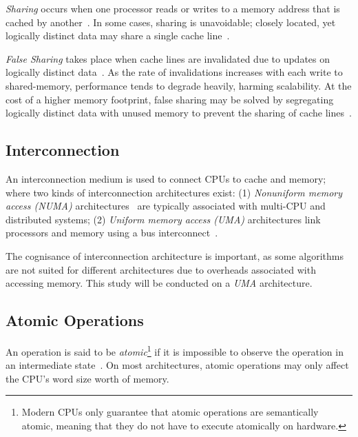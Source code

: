 \emph{Sharing} occurs when one processor reads or writes to a memory address that
is cached by another~\citep[Appendix~B.5.1]{herlihy2020art}. In some cases,
sharing is unavoidable; closely located, yet
logically distinct data may share a single cache
line~\citep[Appendix~B.5.1]{herlihy2020art}. 

\emph{False Sharing} takes place when cache lines are invalidated due to updates
on logically distinct data~\citep[Appendix~B.5.1]{herlihy2020art}. As the
rate of invalidations increases with each write to shared-memory, performance
tends to degrade heavily, harming scalability. At the cost of a higher memory footprint, false
sharing may be solved by segregating logically distinct data with unused memory
to prevent the sharing of cache lines~\citep{scott2013shared}.

\subsection{Interconnection}

An interconnection medium is used to connect CPUs to cache and memory; where
two kinds of interconnection architectures exist: (1)
\emph{Nonuniform memory access (NUMA)}
architectures~\citep[Appendix~B.3]{herlihy2020art} are typically associated with
multi-CPU and distributed systems; (2) \emph{Uniform memory
access (UMA)} architectures link processors and memory using a bus
interconnect~\citep[Appendix~B.3]{herlihy2020art}.

The cognisance of interconnection architecture is important, 
as some algorithms are not suited for different architectures due to
overheads associated with accessing memory. This study will be
conducted on a \emph{UMA} architecture.

\subsection{Atomic Operations}
An operation is said to be \emph{atomic}\footnote{Modern CPUs only guarantee
that atomic operations are semantically atomic, meaning that they do not
have to execute atomically on hardware.} if it is impossible to observe the operation in an
intermediate state~\citep{perfbook2021}. On most architectures, atomic
operations may only affect the CPU's word size worth of memory.

